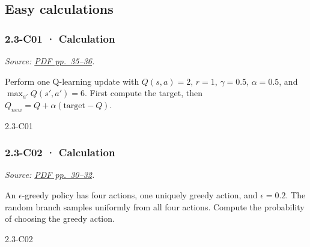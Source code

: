 \subsection{Easy calculations}\label{easy-calculations-5}

\noindent\begin{minipage}{\linewidth}

\subsubsection{2.3-C01 · Calculation}\label{c01-calculation-5}

\emph{Source:
\href{../Lecture\%20Slides/2.3.\%20Q-learning.pdf\#page=35}{PDF
pp.~35--36}.}

Perform one Q-learning update with \(Q(s,a)=2\), \(r=1\),
\(\gamma=0.5\), \(\alpha=0.5\), and \(\max_{a'}Q(s',a')=6\). First
compute the target, then \(Q_{new}=Q+\alpha(\text{target}-Q)\).

\begin{solution}[26mm]{2.3-C01}

\end{solution}
\end{minipage}\par\medskip

\noindent\begin{minipage}{\linewidth}

\subsubsection{2.3-C02 · Calculation}\label{c02-calculation-5}

\emph{Source:
\href{../Lecture\%20Slides/2.3.\%20Q-learning.pdf\#page=30}{PDF
pp.~30--32}.}

An \(\epsilon\)-greedy policy has four actions, one uniquely greedy
action, and \(\epsilon=0.2\). The random branch samples uniformly from
all four actions. Compute the probability of choosing the greedy action.

\begin{solution}[26mm]{2.3-C02}

\end{solution}
\end{minipage}\par\medskip

